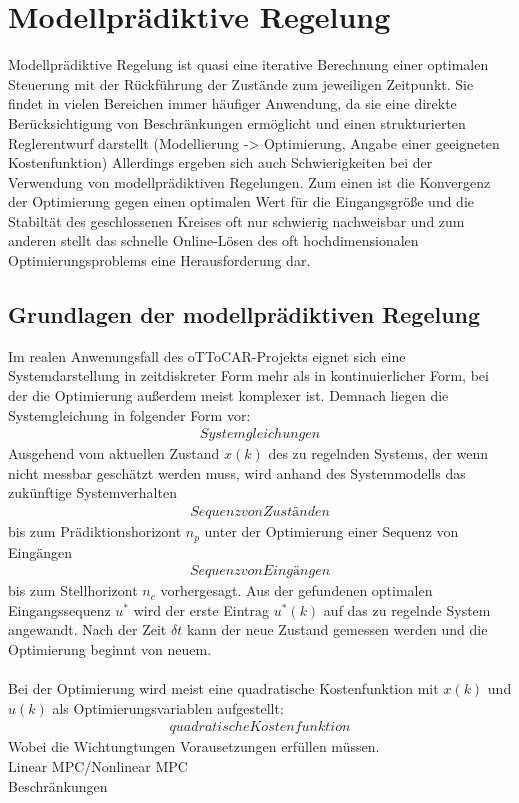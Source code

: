 \section{Modellprädiktive Regelung}
Modellprädiktive Regelung ist quasi eine iterative Berechnung einer optimalen Steuerung mit der Rückführung der Zustände zum jeweiligen Zeitpunkt. Sie findet in vielen Bereichen immer häufiger Anwendung, da sie eine direkte Berücksichtigung von Beschränkungen ermöglicht und einen strukturierten Reglerentwurf darstellt (Modellierung -> Optimierung, Angabe einer geeigneten Kostenfunktion) Allerdings ergeben sich auch Schwierigkeiten bei der Verwendung von modellprädiktiven Regelungen. Zum einen ist die Konvergenz der Optimierung gegen einen optimalen Wert für die Eingangsgröße und die Stabiltät des geschlossenen Kreises oft nur schwierig nachweisbar und zum anderen stellt das schnelle Online-Lösen des oft hochdimensionalen Optimierungsproblems eine Herausforderung dar.
\\
\subsection{Grundlagen der modellprädiktiven Regelung}
Im realen Anwenungsfall des oTToCAR-Projekts eignet sich eine Systemdarstellung in zeitdiskreter Form mehr als in kontinuierlicher Form, bei der die Optimierung außerdem meist komplexer ist. Demnach liegen die Systemgleichung in folgender Form vor:
\begin{align}
  Systemgleichungen
\end{align}
Ausgehend vom aktuellen Zustand $x(k)$ des zu regelnden Systems, der wenn nicht messbar geschätzt werden muss, wird anhand des Systemmodells das zukünftige Systemverhalten
\begin{align}
  Sequenz von Zuständen
\end{align}
bis zum Prädiktionshorizont $n_p$ unter der Optimierung einer Sequenz von Eingängen
\begin{align}
  Sequenz von Eingängen
\end{align}
bis zum Stellhorizont $n_c$ vorhergesagt. Aus der gefundenen optimalen Eingangssequenz $u^*$ wird der erste Eintrag $u^*(k)$ auf das zu regelnde System angewandt. Nach der Zeit $\delta t$ kann der neue Zustand gemessen werden und die Optimierung beginnt von neuem.\\ \\
Bei der Optimierung wird meist eine quadratische Kostenfunktion mit $x(k)$ und $u(k)$ als Optimierungsvariablen aufgestellt:
\begin{align}
  quadratische Kostenfunktion
\end{align}
Wobei die Wichtungtungen Vorausetzungen erfüllen müssen.\\
Linear MPC/Nonlinear MPC\\
Beschränkungen
